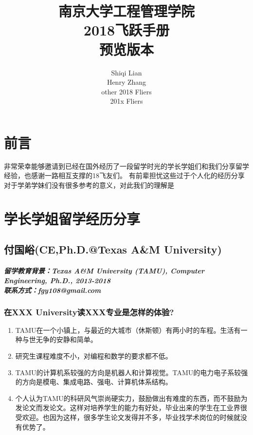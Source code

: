 \documentclass[a4paper,UTF8]{book}
\begin{document}
\title{南京大学工程管理学院\\2018飞跃手册\\预览版本}
\author{Shiqi Lian\\Henry Zhang\\other 2018 Fliers\\201x Fliers }
\maketitle %
\tableofcontents
\chapter{前言}
非常荣幸能够邀请到已经在国外经历了一段留学时光的学长学姐们和我们分享留学经验，也感谢一路相互支撑的18飞友们。
有前辈担忧这些过于个人化的经历分享对于学弟学妹们没有很多参考的意义，对此我们的理解是
\chapter{学长学姐留学经历分享}  %

\newpage
\section{付国峪(CE,Ph.D.@Texas A\&M University)}
\paragraph{留学教育背景：Texas A\&M University (TAMU), Computer Engineering, Ph.D., 2013-2018\\联系方式：fgy108@gmail.com}

\subsection*{在XXX University读XXX专业是怎样的体验?}
    \begin{enumerate}[itemindent=0pt,itemsep=0pt,parsep=0pt,topsep=-40pt]
        \item TAMU在一个小镇上，与最近的大城市（休斯顿）有两小时的车程。生活有一种与世无争的安静和简单。
        \item 研究生课程难度不小，对编程和数学的要求都不低。
        \item TAMU的计算机系较强的方向是机器人和计算视觉。TAMU的电力电子系较强的方向是模电、集成电路、强电、计算机体系结构。
        \item 个人认为TAMU的科研风气崇尚硬实力，鼓励做出有难度的东西，而不鼓励为发论文而发论文。这样对培养学生的能力有好处，毕业出来的学生在工业界很受欢迎。也因为这样，很多学生论文发得并不多，毕业找学术岗位的时候就没有优势了。
    \end{enumerate}
\end{document}
